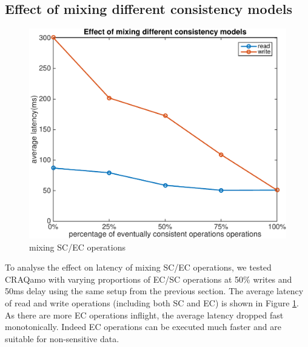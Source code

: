 \subsection{Effect of mixing different consistency models}
\vspace{-2mm}
\begin{figure}[h]
\centering
\includegraphics[width=\linewidth]{figures/mix.pdf}
\caption{mixing SC/EC operations}
\label{fig:mix}
\end{figure}
\vspace{-5mm}

To analyse the effect on latency of mixing SC/EC operations, we tested CRAQamo with varying proportions of EC/SC operations at 50\% writes and 50ms delay using the same setup from the previous section. The average latency of read and write operations (including both SC and EC) is shown in Figure \ref{fig:mix}.  As there are more EC operations inflight, the average latency dropped fast monotonically. Indeed EC operations can be executed much faster and are suitable for non-sensitive data.


